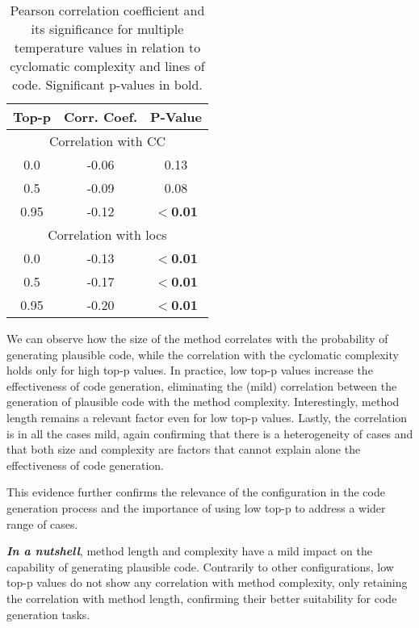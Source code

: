 \begin{table}[ht]
\caption{Pearson correlation coefficient and its significance for multiple temperature values in relation to cyclomatic complexity and lines of code. Significant p-values in bold.}

\centering
\begin{tabular}{ccc}
\textbf{Top-p} & \textbf{Corr. Coef.} & \textbf{P-Value}  \\
\toprule
\multicolumn{3}{c}{Correlation with CC} \\
\midrule
0.0 & -0.06 & 0.13 \\
0.5 & -0.09 & 0.08 \\
0.95 & -0.12 & \textbf{$<$0.01} \\
\toprule
\multicolumn{3}{c}{Correlation with locs} \\
\midrule
0.0 & -0.13 & \textbf{$<$0.01}  \\
0.5 &  -0.17 & \textbf{$<$0.01}  \\
0.95 & -0.20 & \textbf{$<$0.01}  \\
\bottomrule

\end{tabular}
\label{tab:correlationTopP}
\end{table}

We can observe how the size of the method correlates with the probability of generating plausible code, while the correlation with the cyclomatic complexity holds only for high top-p values. In practice, low top-p values increase the effectiveness of code generation, eliminating the (mild) correlation between the generation of plausible code with the method complexity. Interestingly, method length remains a relevant factor even for low top-p values. Lastly, the correlation is in all the cases mild, again confirming that there is a heterogeneity of cases and that both size and complexity are factors that cannot explain alone the effectiveness of code generation.


This evidence further confirms the relevance of the configuration in the code generation process and the importance of using low top-p to address a wider range of cases. 


\textbf{\textit{In a nutshell}}, method length and complexity have a mild impact on the capability of generating plausible code. Contrarily to other configurations, low top-p values do not show any correlation with method complexity, only retaining the correlation with method length, confirming their better suitability for code generation tasks. 




